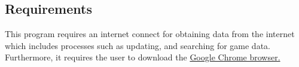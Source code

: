 \subsection{Requirements}

This program requires an internet connect for obtaining data from the
internet which includes processes such as updating, and searching for
game data. Furthermore, it requires the user to download the
\href{https://www.google.com/chrome/index.html}{Google Chrome browser.}

